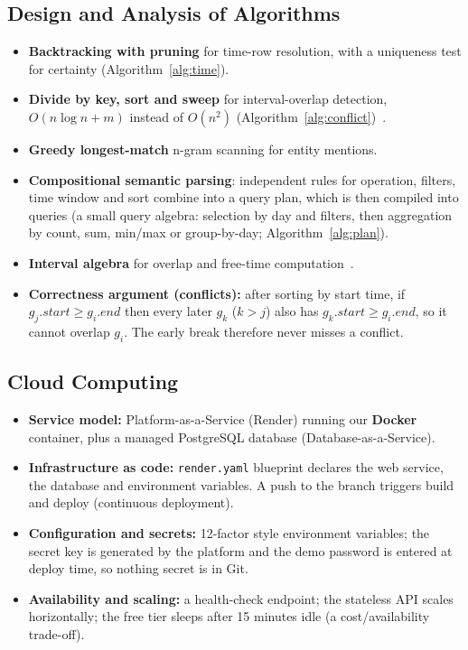 \subsection{Design and Analysis of Algorithms}
\begin{itemize}
\item \textbf{Backtracking with pruning} for time-row resolution, with a uniqueness test for
      certainty (Algorithm~\ref{alg:time}).
\item \textbf{Divide by key, sort and sweep} for interval-overlap detection, $O(n\log n + m)$
      instead of $O(n^2)$ (Algorithm~\ref{alg:conflict})~\cite{cormen2009}.
\item \textbf{Greedy longest-match} n-gram scanning for entity mentions.
\item \textbf{Compositional semantic parsing}: independent rules for operation, filters, time window and
      sort combine into a query plan, which is then compiled into queries (a small query algebra:
      selection by day and filters, then aggregation by count, sum, min/max or group-by-day; Algorithm~\ref{alg:plan}).
\item \textbf{Interval algebra} for overlap and free-time computation~\cite{allen1983}.
\item \textbf{Correctness argument (conflicts):} after sorting by start time, if $g_j.\mathit{start}
      \geq g_i.\mathit{end}$ then every later $g_k$ ($k>j$) also has $g_k.\mathit{start} \geq g_i.\mathit{end}$,
      so it cannot overlap $g_i$. The early break therefore never misses a conflict.
\end{itemize}

\subsection{Cloud Computing}
\begin{itemize}
\item \textbf{Service model:} Platform-as-a-Service (Render) running our \textbf{Docker} container,
      plus a managed PostgreSQL database (Database-as-a-Service).
\item \textbf{Infrastructure as code:} \texttt{render.yaml} blueprint declares the web service, the
      database and environment variables. A push to the branch triggers build and deploy (continuous deployment).
\item \textbf{Configuration and secrets:} 12-factor style environment variables; the secret key is
      generated by the platform and the demo password is entered at deploy time, so nothing secret is
      in Git.
\item \textbf{Availability and scaling:} a health-check endpoint; the stateless API scales
      horizontally; the free tier sleeps after 15 minutes idle (a cost/availability trade-off).
\end{itemize}

